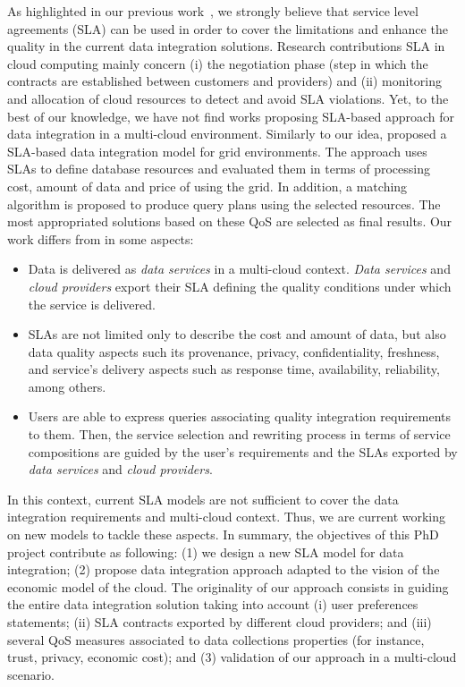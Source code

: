 As highlighted in our previous work~\cite{Carvalho2015}, we strongly believe that service level agreements (SLA) can be used in order to cover the limitations and enhance the quality in the current data integration solutions. Research contributions SLA in cloud computing mainly concern (i) the negotiation phase (step in which the contracts are established between customers and providers) and (ii) monitoring and allocation of cloud resources to detect and avoid SLA violations. Yet, to the best of our knowledge, we have not find works proposing SLA-based approach for data integration in a multi-cloud environment. Similarly to our idea, \cite{Nie07} proposed a SLA-based data integration model for grid environments. The approach uses SLAs to define database resources and evaluated them in terms of processing cost, amount of data and price of using the grid. In addition, a matching algorithm is proposed to produce query plans using the selected resources. The most appropriated solutions based on these QoS are selected as final results. Our work differs from \cite{Nie07} in some aspects: 
\begin{itemize}
\item Data is delivered as \textit{data services} in a multi-cloud context. \textit{Data services} and \textit{cloud providers} export their SLA defining the quality conditions under which the service is delivered.
\item SLAs are not limited only to describe the cost and amount of data, but also data quality aspects such its provenance, privacy, confidentiality, freshness, and service's delivery aspects such as response time, availability, reliability, among others.
\item Users are able to express queries associating quality integration requirements to them. Then, the service selection and rewriting process in terms of service compositions are guided by the user's requirements and the SLAs exported by \textit{data services} and \textit{cloud providers}.
\end{itemize}

In this context, current SLA models are not sufficient to cover the data integration requirements and multi-cloud context. Thus, we are current working on new models to tackle these aspects. In summary, the objectives of this PhD project contribute as following: (1) we design a new SLA model for data integration; (2) propose data integration approach adapted to the vision of the economic model of the cloud. The originality of our approach consists in guiding the entire data integration solution taking into account (i) user preferences statements; (ii) SLA contracts exported by different cloud providers; and (iii) several QoS measures associated to data collections properties (for instance, trust, privacy, economic cost); and (3) validation of our approach in a multi-cloud scenario.
